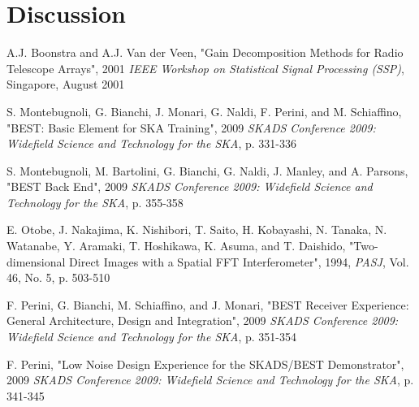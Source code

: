 \documentclass[useAMS,usenatbib,onecolumn]{mn2e}
\begin{document}
\section{Discussion}


\newpage
\begin{thebibliography}{9}

A.J. Boonstra and A.J. Van der Veen,
"Gain Decomposition Methods for Radio Telescope Arrays", 2001
\emph{IEEE Workshop on Statistical Signal Processing (SSP)}, Singapore, August 2001

S. Montebugnoli, G. Bianchi, J. Monari, G. Naldi, F. Perini, and M. Schiaffino,
"BEST: Basic Element for SKA Training", 2009
\emph{SKADS Conference 2009: Widefield Science and Technology for the SKA}, p. 331-336

S. Montebugnoli, M. Bartolini, G. Bianchi, G. Naldi, J. Manley, and A. Parsons,
"BEST Back End", 2009
\emph{SKADS Conference 2009: Widefield Science and Technology for the SKA}, p. 355-358

E. Otobe, J. Nakajima, K. Nishibori, T. Saito, H. Kobayashi, N. Tanaka, N. Watanabe, Y. Aramaki, T. Hoshikawa, K. Asuma, and T. Daishido,
"Two-dimensional Direct Images with a Spatial FFT Interferometer", 1994,
\emph{PASJ}, Vol. 46, No. 5, p. 503-510

F. Perini, G. Bianchi, M. Schiaffino, and J. Monari,
"BEST Receiver Experience: General Architecture, Design and Integration", 2009
\emph{SKADS Conference 2009: Widefield Science and Technology for the SKA}, p. 351-354

F. Perini,
"Low Noise Design Experience for the SKADS/BEST Demonstrator", 2009
\emph{SKADS Conference 2009: Widefield Science and Technology for the SKA}, p. 341-345

\end{thebibliography}
\end{document}
